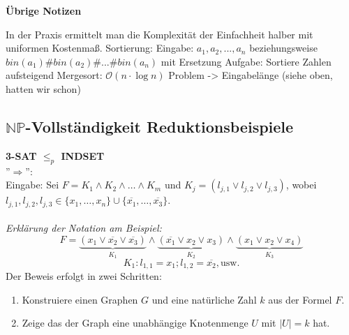 \documentclass{article} %
\begin{document}



\begin{framed}
\textbf{Übrige Notizen}

In der Praxis ermittelt man die Komplexität der Einfachheit halber mit uniformen Kostenmaß.
Sortierung:
Eingabe: $a_1, a_2,...,a_n$ beziehungsweise $bin(a_1) \# bin(a_2) \# ... \# bin(a_n) $ mit Ersetzung 
Aufgabe: Sortiere Zahlen aufsteigend
Mergesort: $\mathcal{O}(n \cdot \log n)$
Problem -> Eingabelänge (siehe oben, hatten wir schon)
\end{framed}

\subsection{$\mathbb{NP}$-Vollständigkeit Reduktionsbeispiele}
\textbf{3-SAT $\leq_p$ INDSET}\\
''$\Rightarrow$'':\\
Eingabe: Sei $F = K_1 \wedge K_2 \wedge \ldots \wedge K_m$ und $K_j = (l_{j,1} \vee l_{j,2} \vee l_{j,3})$, wobei
$l_{j,1}, l_{j,2}, l_{j,3} \in \{x_1, \ldots, x_n\} \cup \{\overline{x_1}, \ldots, \overline{x_3}\}$.\\
\\
\textit{Erklärung der Notation am Beispiel:}\\
\[F = \underbrace{(x_1 \vee \overline{x_2} \vee \overline{x_3})}_{K_1} \wedge \underbrace{(\overline{x_1} \vee x_2 \vee x_3)}_{K_2} \wedge \underbrace{(x_1 \vee x_2 \vee x_4)}_{K_3}\]
\[K_1: l_{1,1} = x_1; l_{1,2} = \overline{x_2}, \text{usw.}\]
Der Beweis erfolgt in zwei Schritten:
\begin{enumerate}
	\item Konstruiere einen Graphen $G$ und eine natürliche Zahl $k$ aus der Formel $F$.
	\item Zeige das der Graph eine unabhängige Knotenmenge $U$ mit $|U| = k$ hat.
\end{enumerate}
\end{document}
